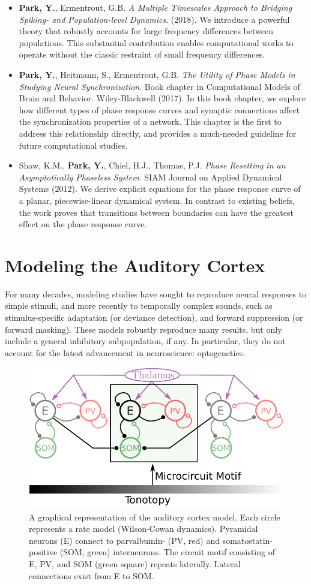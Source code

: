 \documentclass[a4paper,11pt]{article}
\begin{document}
\begin{itemize}
 \item \textbf{Park, Y.}, Ermentrout, G.B. \textit{A Multiple Timescales Approach to Bridging Spiking- and Population-level Dynamics}. (2018). We introduce a powerful theory that robustly accounts for large frequency differences between populations. This substantial contribution enables computational works to operate without the classic restraint of small frequency differences.
 
 \item \textbf{Park, Y.}, Heitmann, S., Ermentrout, G.B. \textit{The Utility of Phase Models in Studying Neural Synchronization}. Book chapter in Computational Models of Brain and Behavior. Wiley-Blackwell (2017). In this book chapter, we explore how different types of phase response curves and synaptic connections affect the synchronization properties of a network. This chapter is the first to address this relationship directly, and provides a much-needed guideline for future computational studies.
 
 \item Shaw, K.M., \textbf{Park, Y.}, Chiel, H.J., Thomas, P.J. \textit{Phase Resetting in an Asymptotically Phaseless System}. SIAM Journal on Applied Dynamical Systems (2012). We derive explicit equations for the phase response curve of a planar, piecewise-linear dynamical system. In contrast to existing beliefs, the work proves that transitions between boundaries can have the greatest effect on the phase response curve.

\end{itemize}



\section{Modeling the Auditory Cortex}
For many decades, modeling studies have sought to reproduce neural responses to simple stimuli, and more recently to temporally complex sounds, such as stimulus-specific adaptation (or deviance detection), and forward suppression (or forward masking). These models robustly reproduce many results, but only include a general inhibitory subpopulation, if any. In particular, they do not account for the latest advancement in neuroscience: optogenetics.

\begin{figure}
\centering
 \includegraphics[width=.5\textwidth]{awc.pdf}
 \caption{A graphical representation of the auditory cortex model. Each circle represents a rate model (Wilson-Cowan dynamics). Pyramidal neurons (E) connect to parvalbumin- (PV, red) and somatostatin-positive (SOM, green) interneurons. The circuit motif consisting of E, PV, and SOM (green square) repeats laterally. Lateral connections exist from E to SOM.}
\end{figure}
\end{document}
